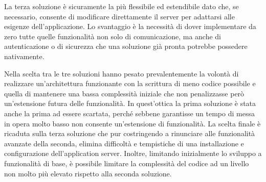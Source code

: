 La terza soluzione \`e sicuramente la pi\`u flessibile ed estendibile dato che, se necessario, consente di modificare direttamente il server per adattarsi alle esigenze dell'applicazione. Lo svantaggio \`e la necessit\`a di dover implementare da zero tutte quelle funzionalit\`a non solo di comunicazione, ma anche di autenticazione o di sicurezza che una soluzione gi\`a pronta potrebbe possedere nativamente.

Nella scelta tra le tre soluzioni hanno pesato prevalentemente la volont\`a di realizzare un'architettura funzionante con la scrittura di meno codice possibile e quella di mantenere una bassa complessit\`a iniziale che non penalizzasse per\`o un'estensione futura delle funzionalit\`a. In quest'ottica la prima soluzione è stata anche la prima ad essere scartata, perché sebbene garantisse un tempo di messa in opera molto basso non consente un'estensione di funzionalità. 
La scelta finale è ricaduta sulla terza soluzione che pur costringendo a rinunciare alle funzionalità avanzate della seconda, elimina difficoltà e tempistiche di una installazione e configurazione dell'application server. Inoltre, limitando inizialmente lo sviluppo a funzionalità di base, è possibile limitare la complessità del codice ad un livello non molto più elevato rispetto alla seconda soluzione.
